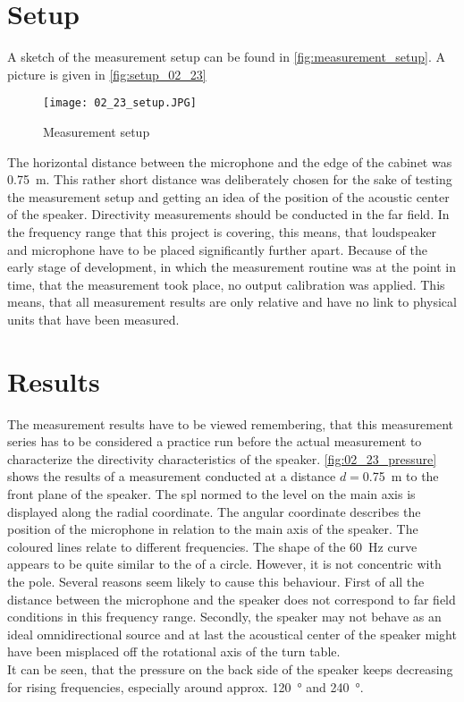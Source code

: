 \section*{Setup}
A sketch of the measurement setup can be found in \autoref{fig:measurement_setup}. A picture is given in \autoref{fig:setup_02_23}

\begin{figure}[htbp]
	\centering
	\texttt{[image: 02\_23\_setup.JPG]}
	\caption{Measurement setup}
		\label{fig:setup_02_23}
\end{figure}

The horizontal distance between the microphone and the edge of the cabinet was \SI{0.75}{\meter}. This rather short distance was deliberately chosen for the sake of testing the measurement setup and getting an idea of the position of the acoustic center of the speaker. Directivity measurements should be conducted in the far field. In the frequency range that this project is covering, this means, that loudspeaker and microphone have to be placed significantly further apart. Because of the early stage of development, in which the measurement routine was at the point in time, that the measurement took place, no output calibration was applied. This means, that all measurement results are only relative and have no link to physical units that have been measured.

\section*{Results}
The measurement results have to be viewed remembering, that this measurement series has to be considered a practice run before the actual measurement to characterize the directivity characteristics of the speaker. \autoref{fig:02_23_pressure} shows the results of a measurement conducted at a distance \(d=\)\SI{0.75}{\meter} to the front plane of the speaker. The \gls{spl} normed to the level on the main axis is displayed along the radial coordinate. The angular coordinate describes the position of the microphone in relation to the main axis of the speaker. The coloured lines relate to different frequencies.
The shape of the \SI{60}{\hertz} curve appears to be quite similar to the of a circle. However, it is not concentric with the pole. Several reasons seem likely to cause this behaviour.  First of all the distance between the microphone and the speaker does not correspond to far field conditions in this frequency range. Secondly, the speaker may not behave as an ideal omnidirectional source and at last the acoustical center of the speaker might have been misplaced off the rotational axis of the turn table.\\
It can be seen, that the pressure on the back side of the speaker keeps decreasing for rising frequencies, especially around approx. \SI{120}{\degree} and \SI{240}{\degree}.

